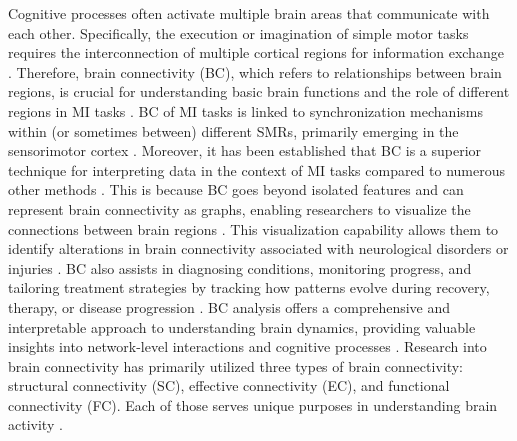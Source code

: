 Cognitive processes often activate multiple brain areas that communicate with each other. Specifically, the execution or imagination of simple motor tasks requires the interconnection of multiple cortical regions for information exchange \cite{leeuwis2021functional}. Therefore, brain connectivity (BC), which refers to relationships between brain regions, is crucial for understanding basic brain functions and the role of different regions in MI tasks \cite{ismail2020graph}. BC of MI tasks is linked to synchronization mechanisms within (or sometimes between) different SMRs, primarily emerging in the sensorimotor cortex \cite{maksimenko2017macroscopic}. Moreover, it has been established that BC is a superior technique for interpreting data in the context of MI tasks compared to numerous other methods \cite{collazos2023posthoc}. This is because BC goes beyond isolated features and can represent brain connectivity as graphs, enabling researchers to visualize the connections between brain regions \cite{grana2023review}. This visualization capability allows them to identify alterations in brain connectivity associated with neurological disorders or injuries \cite{lim2021post}. BC also assists in diagnosing conditions, monitoring progress, and tailoring treatment strategies by tracking how patterns evolve during recovery, therapy, or disease progression \cite{yen2023exploring}. BC analysis offers a comprehensive and interpretable approach to understanding brain dynamics, providing valuable insights into network-level interactions and cognitive processes \cite{tafreshi2019functional, van2014functional, sakkalis2011review}. Research into brain connectivity has primarily utilized three types of brain connectivity: structural connectivity (SC), effective connectivity (EC), and functional connectivity (FC). Each of those serves unique purposes in understanding brain activity \cite{cao2022brain}. 

